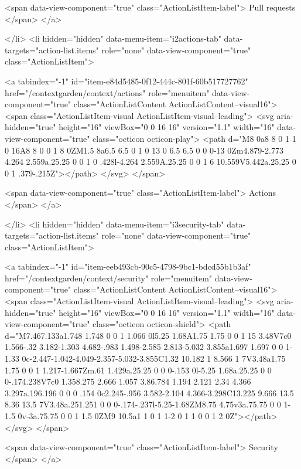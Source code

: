         <span data-view-component="true" class="ActionListItem-label">
          Pull requests
</span>      
</a>
  
</li>
        <li hidden="hidden" data-menu-item="i2actions-tab" data-targets="action-list.items" role="none" data-view-component="true" class="ActionListItem">
    
    
    <a tabindex="-1" id="item-e84d5485-0f12-444c-801f-60b517727762" href="/contextgarden/context/actions" role="menuitem" data-view-component="true" class="ActionListContent ActionListContent--visual16">
        <span class="ActionListItem-visual ActionListItem-visual--leading">
          <svg aria-hidden="true" height="16" viewBox="0 0 16 16" version="1.1" width="16" data-view-component="true" class="octicon octicon-play">
    <path d="M8 0a8 8 0 1 1 0 16A8 8 0 0 1 8 0ZM1.5 8a6.5 6.5 0 1 0 13 0 6.5 6.5 0 0 0-13 0Zm4.879-2.773 4.264 2.559a.25.25 0 0 1 0 .428l-4.264 2.559A.25.25 0 0 1 6 10.559V5.442a.25.25 0 0 1 .379-.215Z"></path>
</svg>
        </span>
      
        <span data-view-component="true" class="ActionListItem-label">
          Actions
</span>      
</a>
  
</li>
        <li hidden="hidden" data-menu-item="i3security-tab" data-targets="action-list.items" role="none" data-view-component="true" class="ActionListItem">
    
    
    <a tabindex="-1" id="item-eeb493cb-90c5-4798-9bc1-bdcd55b1b3af" href="/contextgarden/context/security" role="menuitem" data-view-component="true" class="ActionListContent ActionListContent--visual16">
        <span class="ActionListItem-visual ActionListItem-visual--leading">
          <svg aria-hidden="true" height="16" viewBox="0 0 16 16" version="1.1" width="16" data-view-component="true" class="octicon octicon-shield">
    <path d="M7.467.133a1.748 1.748 0 0 1 1.066 0l5.25 1.68A1.75 1.75 0 0 1 15 3.48V7c0 1.566-.32 3.182-1.303 4.682-.983 1.498-2.585 2.813-5.032 3.855a1.697 1.697 0 0 1-1.33 0c-2.447-1.042-4.049-2.357-5.032-3.855C1.32 10.182 1 8.566 1 7V3.48a1.75 1.75 0 0 1 1.217-1.667Zm.61 1.429a.25.25 0 0 0-.153 0l-5.25 1.68a.25.25 0 0 0-.174.238V7c0 1.358.275 2.666 1.057 3.86.784 1.194 2.121 2.34 4.366 3.297a.196.196 0 0 0 .154 0c2.245-.956 3.582-2.104 4.366-3.298C13.225 9.666 13.5 8.36 13.5 7V3.48a.251.251 0 0 0-.174-.237l-5.25-1.68ZM8.75 4.75v3a.75.75 0 0 1-1.5 0v-3a.75.75 0 0 1 1.5 0ZM9 10.5a1 1 0 1 1-2 0 1 1 0 0 1 2 0Z"></path>
</svg>
        </span>
      
        <span data-view-component="true" class="ActionListItem-label">
          Security
</span>      
</a>
  
